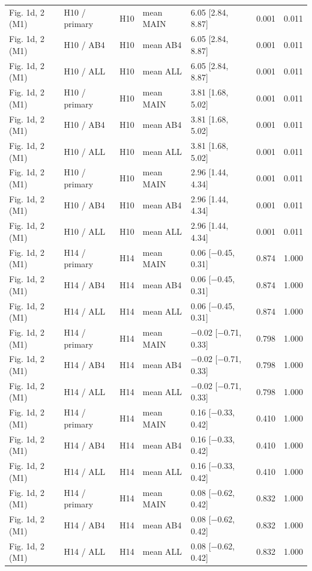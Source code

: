 \begin{longtable}{lllllrr}
Fig. 1d, 2 (M1) & H10 / primary & H10 & mean MAIN & 6.05 [2.84, 8.87] & 0.001 & 0.011 \\
Fig. 1d, 2 (M1) & H10 / AB4 & H10 & mean AB4 & 6.05 [2.84, 8.87] & 0.001 & 0.011 \\
Fig. 1d, 2 (M1) & H10 / ALL & H10 & mean ALL & 6.05 [2.84, 8.87] & 0.001 & 0.011 \\
Fig. 1d, 2 (M1) & H10 / primary & H10 & mean MAIN & 3.81 [1.68, 5.02] & 0.001 & 0.011 \\
Fig. 1d, 2 (M1) & H10 / AB4 & H10 & mean AB4 & 3.81 [1.68, 5.02] & 0.001 & 0.011 \\
Fig. 1d, 2 (M1) & H10 / ALL & H10 & mean ALL & 3.81 [1.68, 5.02] & 0.001 & 0.011 \\
Fig. 1d, 2 (M1) & H10 / primary & H10 & mean MAIN & 2.96 [1.44, 4.34] & 0.001 & 0.011 \\
Fig. 1d, 2 (M1) & H10 / AB4 & H10 & mean AB4 & 2.96 [1.44, 4.34] & 0.001 & 0.011 \\
Fig. 1d, 2 (M1) & H10 / ALL & H10 & mean ALL & 2.96 [1.44, 4.34] & 0.001 & 0.011 \\
Fig. 1d, 2 (M1) & H14 / primary & H14 & mean MAIN & 0.06 [$-$0.45, 0.31] & 0.874 & 1.000 \\
Fig. 1d, 2 (M1) & H14 / AB4 & H14 & mean AB4 & 0.06 [$-$0.45, 0.31] & 0.874 & 1.000 \\
Fig. 1d, 2 (M1) & H14 / ALL & H14 & mean ALL & 0.06 [$-$0.45, 0.31] & 0.874 & 1.000 \\
Fig. 1d, 2 (M1) & H14 / primary & H14 & mean MAIN & $-$0.02 [$-$0.71, 0.33] & 0.798 & 1.000 \\
Fig. 1d, 2 (M1) & H14 / AB4 & H14 & mean AB4 & $-$0.02 [$-$0.71, 0.33] & 0.798 & 1.000 \\
Fig. 1d, 2 (M1) & H14 / ALL & H14 & mean ALL & $-$0.02 [$-$0.71, 0.33] & 0.798 & 1.000 \\
Fig. 1d, 2 (M1) & H14 / primary & H14 & mean MAIN & 0.16 [$-$0.33, 0.42] & 0.410 & 1.000 \\
Fig. 1d, 2 (M1) & H14 / AB4 & H14 & mean AB4 & 0.16 [$-$0.33, 0.42] & 0.410 & 1.000 \\
Fig. 1d, 2 (M1) & H14 / ALL & H14 & mean ALL & 0.16 [$-$0.33, 0.42] & 0.410 & 1.000 \\
Fig. 1d, 2 (M1) & H14 / primary & H14 & mean MAIN & 0.08 [$-$0.62, 0.42] & 0.832 & 1.000 \\
Fig. 1d, 2 (M1) & H14 / AB4 & H14 & mean AB4 & 0.08 [$-$0.62, 0.42] & 0.832 & 1.000 \\
Fig. 1d, 2 (M1) & H14 / ALL & H14 & mean ALL & 0.08 [$-$0.62, 0.42] & 0.832 & 1.000 \\

\end{longtable}
